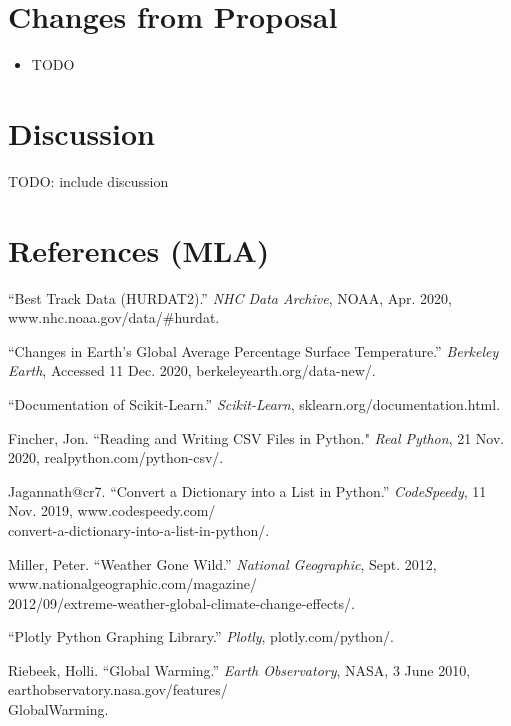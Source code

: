 \documentclass[fontsize=11pt]{article}
\begin{document}
\section*{Changes from Proposal}
\begin{itemize}
    \item TODO
\end{itemize}

\section*{Discussion}

TODO: include discussion

\section*{References (MLA)}

\begin{hangparas}{0.5in}{1}

“Best Track Data (HURDAT2).” \textit{NHC Data Archive}, NOAA, Apr. 2020, www.nhc.noaa.gov/data/\#hurdat.

\bigskip

“Changes in Earth's Global Average Percentage Surface Temperature.” \textit{Berkeley Earth}, Accessed 11 Dec. 2020, berkeleyearth.org/data-new/.

\bigskip

“Documentation of Scikit-Learn.” \textit{Scikit-Learn}, sklearn.org/documentation.html.

\bigskip

Fincher, Jon. ``Reading and Writing CSV Files in Python." \textit{Real Python}, 21 Nov. 2020, realpython.com/python-csv/.

\bigskip

Jagannath@cr7. “Convert a Dictionary into a List in Python.” \textit{CodeSpeedy}, 11 Nov. 2019, www.codespeedy.com/\\convert-a-dictionary-into-a-list-in-python/.

\bigskip

Miller, Peter. “Weather Gone Wild.” \textit{National Geographic}, Sept. 2012, www.nationalgeographic.com/magazine/\\2012/09/extreme-weather-global-climate-change-effects/.

\bigskip

“Plotly Python Graphing Library.” \textit{Plotly}, plotly.com/python/.

\bigskip

Riebeek, Holli. “Global Warming.” \textit{Earth Observatory}, NASA, 3 June 2010, earthobservatory.nasa.gov/features/\\GlobalWarming.



\end{hangparas}
\end{document}
